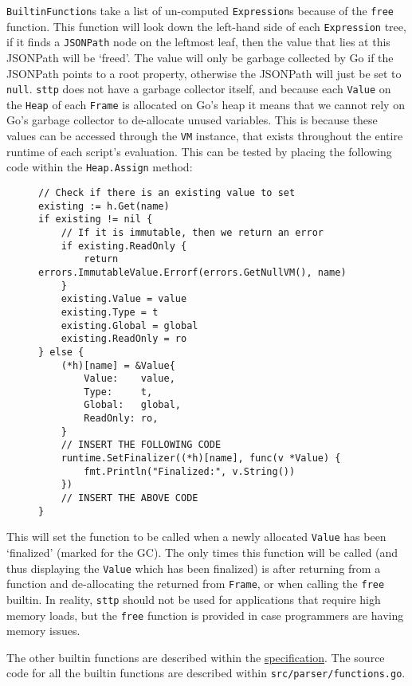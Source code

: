 \verb|BuiltinFunction|s take a list of un-computed \verb|Expression|s because of the \verb|free| function. This function will look down the left-hand side of each \verb|Expression| tree, if it finds a \verb|JSONPath| node on the leftmost leaf, then the value that lies at this JSONPath will be `freed'. The value will only be garbage collected by Go if the JSONPath points to a root property, otherwise the JSONPath will just be set to \verb|null|. \verb|sttp| does not have a garbage collector itself, and because each \verb|Value| on the \verb|Heap| of each \verb|Frame| is allocated on Go's heap it means that we cannot rely on Go's garbage collector to de-allocate unused variables. This is because these values can be accessed through the \verb|VM| instance, that exists throughout the entire runtime of each script's evaluation. This can be tested by placing the following code within the \verb|Heap.Assign| method:

\begin{figure}[H]
    \begin{verbatim}
// Check if there is an existing value to set
existing := h.Get(name)
if existing != nil {
    // If it is immutable, then we return an error
    if existing.ReadOnly {
        return errors.ImmutableValue.Errorf(errors.GetNullVM(), name)
    }
    existing.Value = value
    existing.Type = t
    existing.Global = global
    existing.ReadOnly = ro
} else {
    (*h)[name] = &Value{
        Value:    value,
        Type:     t,
        Global:   global,
        ReadOnly: ro,
    }
    // INSERT THE FOLLOWING CODE
    runtime.SetFinalizer((*h)[name], func(v *Value) {
        fmt.Println("Finalized:", v.String())
    })
    // INSERT THE ABOVE CODE
}
    \end{verbatim}
\end{figure}

This will set the function to be called when a newly allocated \verb|Value| has been `finalized' (marked for the GC). The only times this function will be called (and thus displaying the \verb|Value| which has been finalized) is after returning from a function and de-allocating the returned from \verb|Frame|, or when calling the \verb|free| builtin. In reality, \verb|sttp| should not be used for applications that require high memory loads, but the \verb|free| function is provided in case programmers are having memory issues.

The other builtin functions are described within the \hyperref[sec:builtins]{specification}. The source code for all the builtin functions are described within \verb|src/parser/functions.go|.
